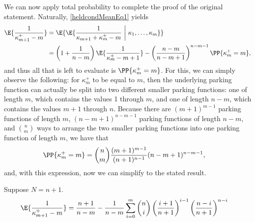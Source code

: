 We can now apply total probability to complete the proof of the original statement. Naturally, \eqref{heldcondMeanEq1} yields
\begin{align}
\E{\frac{1}{\kappa_{m+1}^+ - m} }
&=
\E{\E{\frac{1}{\kappa_{m+1} + \kappa_m^+ - m} ~\bigg|~ \kappa_1, \dots, \kappa_m}}
\\
&=
\left(1 + \frac{1}{n-m}\right)\E{\frac{1}{\kappa_m^+ - m + 1}}
-
\left(\frac{n-m}{n-m+1}\right)^{n-m-1}\PP{\kappa_m^+ = m}
,
\end{align}
and thus all that is left to evaluate is $\PP{\kappa_m^+ = m}$. For this, we can simply observe the following: for $\kappa_m^+$ to be equal to $m$, then the underlying parking function can actually be split into two different smaller parking functions: one of length $m$, which contains the values 1 through $m$, and one of length $n - m$, which contains the values $m+1$ through $n$. Because there are $(m+1)^{m-1}$ parking functions of length $m$, $(n-m+1)^{n-m-1}$ parking functions of length $n-m$, and ${n \choose m}$ ways to arrange the two  smaller parking functions into one parking function of length $m$, we have that
\begin{align}
\PP{\kappa_m^+ = m}
&=
{n \choose m}\frac{(m+1)^{m-1}}{(n+1)^{n-1}}(n-m+1)^{n-m-1}
,
\end{align}
and, with this expression, now we can simplify to the stated result.
\hfill\Halmos\endproof

\begin{corollary}\label{heldmeanRecurSolve1}
Suppose $N = n + 1$.
\begin{align}
\E{\frac{1}{\kappa_{m+1}^+ - m} }
&=
\frac{n+1}{n-m}
-
\frac{1}{n-m}
\sum_{i=0}^m
{n \choose i}
\left(\frac{i+1}{n+1}\right)^{i-1}
\left(\frac{n-i}{n+1}\right)^{n-i}
\end{align}
\end{corollary}
\hfill\Halmos\endproof




